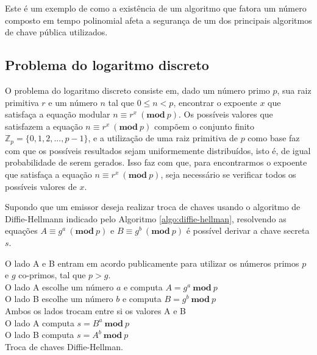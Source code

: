             Este é um exemplo de como a existência de um algoritmo que fatora um número composto em tempo polinomial afeta a segurança de um dos principais algoritmos de chave pública utilizados.

        \subsection{Problema do logaritmo discreto}
        \label{sec:problema_logaritmo_discreto}
        
            O problema do logaritmo discreto consiste em, dado um número primo $p$, sua raiz primitiva $r$ e um número $n$ tal que $0 \le n < p$, encontrar o expoente $x$ que satisfaça a equação modular $n \equiv r^x\ (\textbf{mod}\ p)$. Os possíveis valores que satisfazem a equação $n \equiv r^x\ (\textbf{mod}\ p)$ compõem o conjunto finito $\mathbb{Z}_p = \{0,1,2,...,p-1\}$, e a utilização de uma raiz primitiva de $p$ como base faz com que os possíveis resultados sejam uniformemente distribuídos, isto é, de igual probabilidade de serem gerados. Isso faz com que, para encontrarmos o expoente que satisfaça a equação $n \equiv r^x\ (\textbf{mod}\ p)$, seja necessário se verificar todos os possíveis valores de $x$.

            Supondo que um emissor deseja realizar troca de chaves usando o algoritmo de Diffie-Hellmann indicado pelo Algoritmo \ref{algo:diffie-hellman}, resolvendo as equações $A \equiv g^a\ (\textbf{mod}\ p)$ e $B \equiv g^b\ (\textbf{mod}\ p)$ é possível derivar a chave secreta $s$.

            \begin{algorithm}[!htbp]
                \SetAlgoLined
                O lado A e B entram em acordo publicamente para utilizar os números primos $p$ e $g$ co-primos, tal que $p > g$.\\
                O lado A escolhe um número $a$ e computa $A = g^a\ \textbf{mod}\ p$\\
                O lado B escolhe um número $b$ e computa $B = g^b\ \textbf{mod}\ p$\\
                Ambos os lados trocam entre si os valores A e B\\
                O lado A computa $s = B^a\ \textbf{mod}\ p$\\
                O lado B computa $s = A^b\ \textbf{mod}\ p$\\
                \caption{Troca de chaves Diffie-Hellman.}
                \label{algo:diffie-hellman}
            \end{algorithm}

